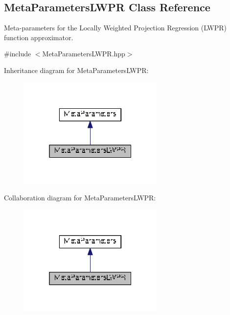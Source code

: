 \hypertarget{classDmpBbo_1_1MetaParametersLWPR}{\subsection{Meta\+Parameters\+L\+W\+P\+R Class Reference}
\label{classDmpBbo_1_1MetaParametersLWPR}
}


Meta-\/parameters for the Locally Weighted Projection Regression (L\+W\+P\+R) function approximator.  




{\ttfamily \#include $<$Meta\+Parameters\+L\+W\+P\+R.\+hpp$>$}



Inheritance diagram for Meta\+Parameters\+L\+W\+P\+R\+:
\nopagebreak
\begin{figure}[H]
\begin{center}
\leavevmode
\includegraphics[width=205pt]{classDmpBbo_1_1MetaParametersLWPR__inherit__graph}
\end{center}
\end{figure}


Collaboration diagram for Meta\+Parameters\+L\+W\+P\+R\+:
\nopagebreak
\begin{figure}[H]
\begin{center}
\leavevmode
\includegraphics[width=205pt]{classDmpBbo_1_1MetaParametersLWPR__coll__graph}
\end{center}
\end{figure}
